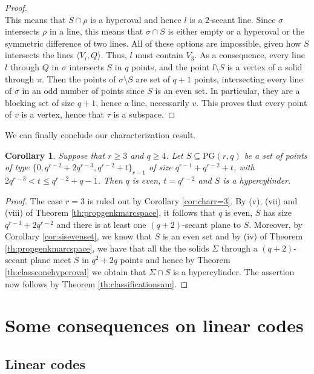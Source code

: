 \documentclass[11pt]{amsart}
\newtheorem{corollary}[theorem]{Corollary}
\newcommand{\PG}{\mathrm{PG}}
\begin{document}
\begin{proof}
\\
This means that $S \cap \rho$ is a hyperoval and hence $l$ is a $2$-secant line.
Since $\sigma$ intersects $\rho$ in a line, this means that $\sigma \cap S$ is either empty or a hyperoval or the symmetric difference of two lines.
All of these options are impossible, given how $S$ intersects the lines $\langle {V_i,Q}\rangle $.
Thus, $l$ must contain $V_3$.
As a consequence, every line $l$ through $Q$ in $\sigma$ intersects $S$ in $q$ points, and the point $l \setminus S$ is a vertex of a solid through $\pi$.
Then the points of $\sigma \setminus S$ are set of $q+1$ points, intersecting every line of $\sigma$ in an odd number of points since $S$ is an even set.
In particular, they are a blocking set of size $q+1$, hence a line, necessarily $v$.
This proves that every point of $v$ is a vertex, hence that $\tau$ is a subspace.
\end{proof}

We can finally conclude our characterization result.

\begin{corollary}\label{cor:hypercylinder}
Suppose that $r\geq 3$ and $q\geq 4$. Let $S \subseteq \PG(r,q)$ be a set of points of type $\{0,q^{r-2}+2q^{r-3},q^{r-2}+t\}_{r-1}$ of size $q^{r-1}+q^{r-2}+t$, with $2q^{r-3}< t \leq q^{r-2}+q-1$. Then $q$ is even, $t=q^{r-2}$ and $S$ is a hypercylinder.
\end{corollary}
\begin{proof}
The case $r=3$ is ruled out by Corollary \ref{cor:charr=3}.
By (v), (vii) and (viii) of Theorem \ref{th:propgenkmarcspace}, it follows that $q$ is even, $S$ has size $q^{r-1}+2q^{r-2}$ and there is at least one $(q+2)$-secant plane to $S$. Moreover, by Corollary \ref{cor:sisevenset}, we know that $S$ is an even set and by (iv) of Theorem \ref{th:propgenkmarcspace}, we have that all the the solids $\Sigma$ through a $(q+2)$-secant plane meet $S$ in $q^2+2q$ points and hence by Theorem \ref{th:classconehyperoval} we obtain that $\Sigma\cap S$ is a hypercylinder. The assertion now follows by Theorem \ref{th:classificationsam}.
\end{proof}

\section{Some consequences on linear codes}\label{sec:codes}

\subsection{Linear codes}
\end{document}
